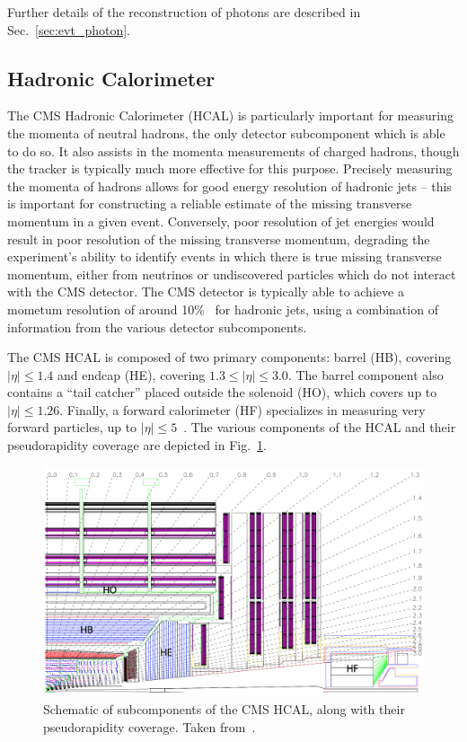 Further details of the reconstruction of photons are described in Sec.~\ref{sec:evt_photon}.

\subsection{Hadronic Calorimeter} \label{sec:cms_hcal}
The CMS Hadronic Calorimeter (HCAL) is particularly important for measuring the momenta of neutral hadrons, the only detector subcomponent which is able to do so.
It also assists in the momenta measurements of charged hadrons, though the tracker is typically much more effective for this purpose.
Precisely measuring the momenta of hadrons allows for good energy resolution of hadronic jets -- this is important for constructing a reliable estimate of the missing transverse momentum in a given event.
Conversely, poor resolution of jet energies would result in poor resolution of the missing transverse momentum, degrading the experiment's ability to identify events in which there is true missing transverse momentum, either from neutrinos or undiscovered particles which do not interact with the CMS detector.
The CMS detector is typically able to achieve a mometum resolution of around 10\%~\cite{Bayatian:2006nff} for hadronic jets, using a combination of information from the various detector subcomponents.

The CMS HCAL is composed of two primary components: barrel (HB), covering $|\eta| \leq 1.4$ and endcap (HE), covering $1.3 \leq |\eta| \leq 3.0$.
The barrel component also contains a ``tail catcher'' placed outside the solenoid (HO), which covers up to $|\eta| \leq 1.26$.
Finally, a forward calorimeter (HF) specializes in measuring very forward particles, up to $|\eta| \leq 5$~\cite{Bayatian:2006nff}.
The various components of the HCAL and their pseudorapidity coverage are depicted in Fig.~\ref{fig:cms_hcal_schematic}.

\begin{figure} [htbp!]
    \centering
    \includegraphics[width=0.7\linewidth]{figures/cms/hcal_schematic.png}
    \caption{Schematic of subcomponents of the CMS HCAL, along with their pseudorapidity coverage. Taken from~\cite{Chatrchyan:2008aa}.}
    \label{fig:cms_hcal_schematic}
\end{figure}

